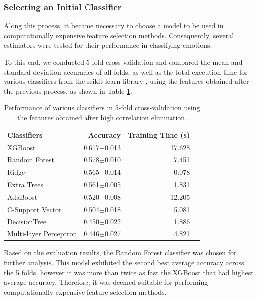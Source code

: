\subsubsection{Selecting an Initial Classifier}

Along this process, it became necessary to choose a model to be used in computationally expensive feature selection methods. Consequently, several estimators were tested for their performance in classifying emotions.

To this end, we conducted 5-fold cross-validation and compared the mean and standard deviation accuracies of all folds, as well as the total execution time for various classifiers from the scikit-learn library \cite{pedregosa2011scikit}, using the features obtained after the previous process, as shown in Table \ref{tab:modelsPerformance}.

\begin{table}[H]
	\caption{Performance of various classifiers in 5-fold cross-validation using the features obtained after high correlation elimination.}
	\centering
	\label{tab:modelsPerformance}
	\begin{tabular}{lrrr}
		\toprule
		Classifiers &  Accuracy & Training Time (s) \\
		\midrule
		XGBoost                &        0.617$\pm$0.013  & 17.628 \\
		Random Forest          &        0.578$\pm$0.010  &  7.451 \\
		Ridge                  &        0.565$\pm$0.014  &  0.078 \\
		Extra Trees            &        0.561$\pm$0.005  &  1.831  \\
		AdaBoost               &        0.520$\pm$0.008  & 12.205  \\
		C-Support Vector       &        0.504$\pm$0.018  &  5.081 \\
		DecisionTree           &        0.450$\pm$0.022  &  1.886 \\
		Multi-layer Perceptron &        0.446$\pm$0.027  &  4.821 \\
		\bottomrule
	\end{tabular}
\end{table}

Based on the evaluation results, the Random Forest classifier was chosen for further analysis. This model exhibited the second best average accuracy across the 5 folds, however it was more than twice as fast the XGBoost that had highest average accuracy. Therefore, it was deemed suitable for performing computationally expensive feature selection methods.


